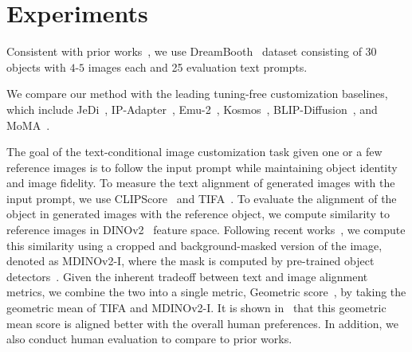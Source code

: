
\section{Experiments}


 Consistent with prior works~\cite{zeng2024jedi,song2024moma,pan2023kosmos}, we use DreamBooth~\cite{ruiz2022dreambooth} dataset consisting of $30$ objects with $4$-$5$ images each and 25 evaluation text prompts.


 We compare our method with the leading tuning-free customization baselines, which include JeDi~\cite{zeng2024jedi}, IP-Adapter~\cite{ye2023ip}, Emu-2~\cite{Emu2}, Kosmos~\cite{pan2023kosmos}, BLIP-Diffusion~\cite{li2023blip}, and MoMA~\cite{song2024moma}.

 The goal of the text-conditional image customization task given one or a few reference images is to follow the input prompt while maintaining object identity and image fidelity. To measure the text alignment of generated images with the input prompt, we use CLIPScore~\cite{radford2021learning} and TIFA~\cite{hu2023tifa}. 
To evaluate the alignment of the object in generated images with the reference object, we compute similarity to reference images in DINOv2~\cite{oquab2023dinov2} feature space. Following recent works~\cite{zeng2024jedi,song2024moma}, we compute this similarity using a cropped and background-masked version of the image, denoted as MDINOv2-I, where the mask is computed by pre-trained object detectors~\cite{kirillov2023segment,zhou2022detecting,ren2024grounded}. Given the inherent tradeoff between text and image alignment metrics, we combine the two into a single metric, Geometric score~\cite{yan2023motion}, by taking the geometric mean of TIFA and MDINOv2-I. It is shown in~\cite{yan2023motion} that this geometric mean score is aligned better with the overall human preferences. 
In addition, we also conduct human evaluation to compare to prior works. 









